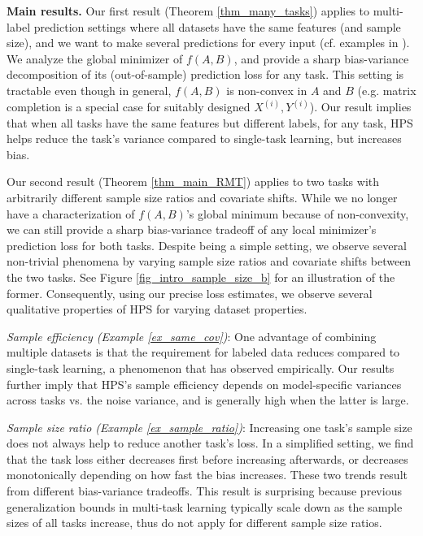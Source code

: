 \textbf{Main results.}
Our first result (Theorem \ref{thm_many_tasks}) applies to multi-label prediction settings where all datasets have the same features (and sample size), and we want to make several predictions for every input (cf. examples in \citet{hsu2009multi}).
We analyze the global minimizer of $f(A, B)$, and provide a sharp bias-variance decomposition of its (out-of-sample) prediction loss for any task.
This setting is tractable even though in general, $f(A, B)$ is non-convex in $A$ and $B$ (e.g. matrix completion is a special case for suitably designed $X^{(i)}, Y^{(i)}$).
Our result implies that when all tasks have the same features but different labels, for any task, HPS helps reduce the task's variance compared to single-task learning, but increases bias.

Our second result (Theorem \ref{thm_main_RMT}) applies to two tasks with arbitrarily different sample size ratios and covariate shifts.
While we no longer have a characterization of $f(A, B)$'s global minimum because of non-convexity, we can still provide a sharp bias-variance tradeoff of any local minimizer's prediction loss for both tasks.
Despite being a simple setting, we observe several non-trivial phenomena by varying sample size ratios and covariate shifts between the two tasks.
See Figure \ref{fig_intro_sample_size_b} for an illustration of the former.
Consequently, using our precise loss estimates, we observe several qualitative properties of HPS for varying dataset properties.

\textit{Sample efficiency (Example \ref{ex_same_cov})}:
	One advantage of combining multiple datasets is that the requirement for labeled data reduces compared to single-task learning, a phenomenon that \citet{ZSSGM18} has observed empirically.
	Our results further imply that HPS's sample efficiency depends on model-specific variances across tasks vs. the noise variance, and is generally high when the latter is large.

\textit{Sample size ratio (Example \ref{ex_sample_ratio})}: Increasing one task's sample size does not always help to reduce another task's loss. In a simplified setting, we find that the task loss either decreases first before increasing afterwards, or decreases monotonically depending on how fast the bias increases. These two trends result from different bias-variance tradeoffs. This result is surprising because previous generalization bounds in multi-task learning typically scale down as the sample sizes of all tasks increase, thus do not apply for different sample size ratios.

